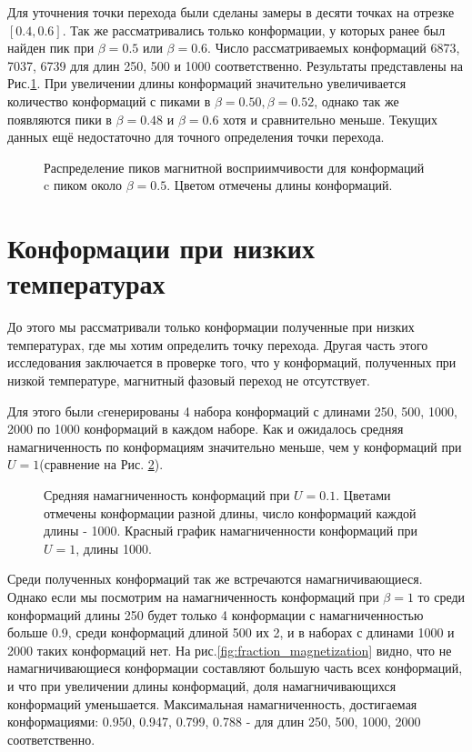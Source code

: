 \documentclass[a4paper,12pt]{article}
\begin{document}
Для уточнения точки перехода были сделаны замеры в десяти точках на отрезке $[0.4, 0.6]$. Так же рассматривались только конформации, у которых ранее был найден пик при $\beta=0.5$ или $\beta=0.6$. Число рассматриваемых конформаций 6873, 7037, 6739 для длин 250, 500 и 1000 соответственно. Результаты представлены на Рис.\ref{fig:ms_peaks_close}. При увеличении длины конформаций значительно увеличивается количество конформаций с пиками в $\beta = 0.50, \beta = 0.52$, однако так же появляются пики в $\beta = 0.48$ и $ \beta = 0.6$ хотя и сравнительно меньше. Текущих данных ещё недостаточно для точного определения точки перехода.


\begin{figure}[htb]
	\centering
	
	\caption{Распределение пиков магнитной восприимчивости для конформаций c пиком около $\beta = 0.5$. Цветом отмечены длины конформаций.}
	\label{fig:ms_peaks_close}
\end{figure}

\section{Конформации при низких температурах}
До этого мы рассматривали только конформации полученные при низких температурах, где мы хотим определить точку перехода. Другая часть этого исследования заключается в проверке того, что у конформаций, полученных при низкой температуре, магнитный фазовый переход не отсутствует.

Для этого были cгенерированы 4 набора конформаций с длинами 250, 500, 1000, 2000 по 1000 конформаций в каждом наборе. Как и ожидалось средняя намагниченность по конформациям значительно меньше, чем у конформаций при $U = 1$(сравнение на Рис. \ref{fig:U0.1_mean_mag2}). 

\begin{figure}[htb]
	\centering
	
    
    \caption{Средняя намагниченность конформаций при $U=0.1$. Цветами отмечены конформации разной длины, число конформаций каждой длины - 1000. Красный график намагниченности конформаций при $U=1$, длины 1000.}
    \label{fig:U0.1_mean_mag2}
\end{figure}

Среди полученных конформаций так же встречаются намагничивающиеся. Однако если мы посмотрим на намагниченность конформаций при $\beta = 1$ то среди конформаций длины 250 будет только 4 конформации с намагниченностью больше 0.9, среди конформаций длиной 500 их 2, и в наборах с длинами 1000 и 2000 таких конформаций нет. На рис.\ref{fig:fraction_magnetization} видно, что не намагничивающиеся конформации составляют большую часть всех конформаций, и что при увеличении длины конформаций, доля намагничивающихся конформаций уменьшается. Максимальная намагниченность, достигаемая конформациями: 0.950, 0.947, 0.799, 0.788 - для длин 250, 500, 1000, 2000 соответственно.
\end{document}
